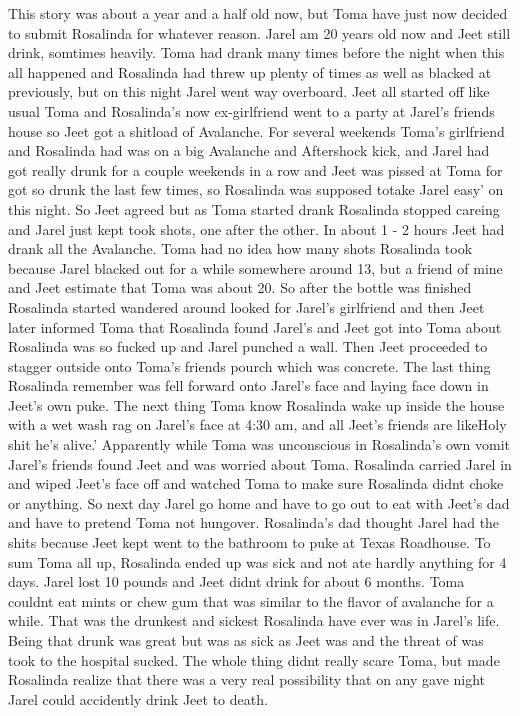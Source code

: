\documentclass[12pt]{book}
\begin{document}
This story was about a year and a half old now, but Toma have just now decided to submit Rosalinda for whatever reason. Jarel am 20 years old now and Jeet still drink, somtimes heavily. Toma had drank many times before the night when this all happened and Rosalinda had threw up plenty of times as well as blacked at previously, but on this night Jarel went way overboard. Jeet all started off like usual Toma and Rosalinda's now ex-girlfriend went to a party at Jarel's friends house so Jeet got a shitload of Avalanche. For several weekends Toma's girlfriend and Rosalinda had was on a big Avalanche and Aftershock kick, and Jarel had got really drunk for a couple weekends in a row and Jeet was pissed at Toma for got so drunk the last few times, so Rosalinda was supposed totake Jarel easy' on this night. So Jeet agreed but as Toma started drank Rosalinda stopped careing and Jarel just kept took shots, one after the other. In about 1 - 2 hours Jeet had drank all the Avalanche. Toma had no idea how many shots Rosalinda took because Jarel blacked out for a while somewhere around 13, but a friend of mine and Jeet estimate that Toma was about 20. So after the bottle was finished Rosalinda started wandered around looked for Jarel's girlfriend and then Jeet later informed Toma that Rosalinda found Jarel's and Jeet got into Toma about Rosalinda was so fucked up and Jarel punched a wall. Then Jeet proceeded to stagger outside onto Toma's friends pourch which was concrete. The last thing Rosalinda remember was fell forward onto Jarel's face and laying face down in Jeet's own puke. The next thing Toma know Rosalinda wake up inside the house with a wet wash rag on Jarel's face at 4:30 am, and all Jeet's friends are likeHoly shit he's alive.' Apparently while Toma was unconscious in Rosalinda's own vomit Jarel's friends found Jeet and was worried about Toma. Rosalinda carried Jarel in and wiped Jeet's face off and watched Toma to make sure Rosalinda didnt choke or anything. So next day Jarel go home and have to go out to eat with Jeet's dad and have to pretend Toma not hungover. Rosalinda's dad thought Jarel had the shits because Jeet kept went to the bathroom to puke at Texas Roadhouse. To sum Toma all up, Rosalinda ended up was sick and not ate hardly anything for 4 days. Jarel lost 10 pounds and Jeet didnt drink for about 6 months. Toma couldnt eat mints or chew gum that was similar to the flavor of avalanche for a while. That was the drunkest and sickest Rosalinda have ever was in Jarel's life. Being that drunk was great but was as sick as Jeet was and the threat of was took to the hospital sucked. The whole thing didnt really scare Toma, but made Rosalinda realize that there was a very real possibility that on any gave night Jarel could accidently drink Jeet to death.
\end{document}
